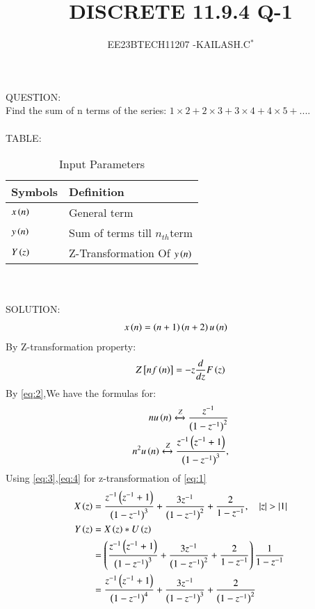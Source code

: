 \documentclass[journal,12pt,twocolumn]{IEEEtran}
\theoremstyle{remark}
\begin{document}

\vspace{3cm}

\title{DISCRETE 11.9.4 Q-1}
\author{EE23BTECH11207 -KAILASH.C$^{*}$%
}
\maketitle
\newpage
\bigskip

\renewcommand{\thefigure}{\theenumi}
\renewcommand{\thetable}{\theenumi}


QUESTION:\\
Find the sum of n terms of the series:
$1\times2+2\times3+3\times4+4\times5+....$\\ \\
TABLE:\\
\begin{table}[h]
\begin{tabular}{|l|l|}
\hline
\textbf{Symbols} & \textbf{Definition}\\ \hline
$x\left(n\right)$ & General term \\ \hline
$y\left(n\right)$ & Sum of terms till $n_{th}$term \\ \hline
$Y\left(z\right)$ & Z-Transformation Of $y\left(n\right)$\\ \hline
\end{tabular}
\caption{Input Parameters}
\label{Fig:1}
\end{table}\\ \\
SOLUTION:\\
\begin{align}
 x\left(n\right)&=\left(n+1\right)\left(n+2\right)u\left(n\right)   \label{eq:1}
\end{align}
By Z-transformation property:
\begin{align}
Z{}\left[nf\left(n\right)\right]=-z\frac{d}{dz}F\left(z\right)\label{eq:2}
\end{align}
By \eqref{eq:2},We have the formulas for:
\begin{align}
nu\left(n\right)\xleftrightarrow[]{Z} \frac{z^{-1}}{\left(1-z^{-1}\right)^2}\label{eq:3}\\
n^2u\left(n\right)\xleftrightarrow[]{Z}\frac{z^{-1}\left(z^{-1}+1\right)}{\left(1-z^{-1}\right)^3},\label{eq:4}
\end{align}
Using \eqref{eq:3},\eqref{eq:4} for z-transformation of \eqref{eq:1}
\begin{align}
    X\left(z\right)&=\frac{z^{-1}\left(z^{-1}+1\right)}{\left(1-z^{-1}\right)^3}+\frac{3z^{-1}}{\left(1-z^{-1}\right)^2}+\frac{2}{1-z^{-1}},\quad\left\vert z\right\vert>\left\vert1\right\vert\label{eq:5}\\
    Y\left(z\right)&=X\left(z\right)*U\left(z\right)\label{eq:6}\\
   &=\left(\frac{z^{-1}\left(z^{-1}+1\right)}{\left(1-z^{-1}\right)^3}+\frac{3z^{-1}}{\left(1-z^{-1}\right)^2}+\frac{2}{1-z^{-1}}\right)\frac{1}{1-z^{-1}}\label{eq:7}\\
    &=\frac{z^{-1}\left(z^{-1}+1\right)}{\left(1-z^{-1}\right)^4}+\frac{3z^{-1}}{\left(1-z^{-1}\right)^3}+\frac{2}{\left(1-z^{-1}\right)^2}\label{eq:8}
\end{align}
\end{document}
